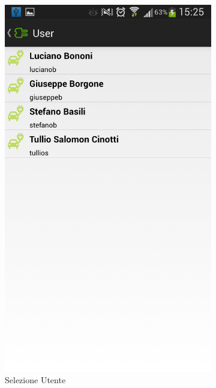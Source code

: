 \begin{figure}
\begin{subfigure}{0.45\textwidth}
		\includegraphics[width=\textwidth]{assets/mobile-app-select-user.png}
		\caption{Selezione Utente}
		\label{fig:select-user}
    \end{subfigure}
    	\begin{subfigure}{0.45\textwidth}

\end{subfigure}
\end{figure}
